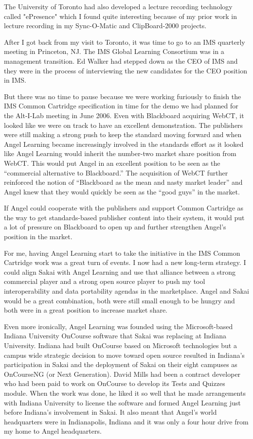 \documentclass[12pt]{book}
\begin{document}
The University of Toronto had also developed a
lecture recording technology called "ePresence" which
I found quite interesting because of my prior
work in lecture recording in my Sync-O-Matic
and ClipBoard-2000 projects.

After I got back from my visit to Toronto, it was
time to go to an IMS quarterly meeting in Princeton,
NJ.  The IMS Global Learning Consortium was in a
management transition.   Ed Walker had
stepped down as the CEO of IMS and they were in the
process of interviewing the new candidates for the
CEO position in IMS.

But there was no time to pause because we were working
furiously to finish the IMS Common Cartridge
specification in time for the demo we had planned
for the Alt-I-Lab meeting in June 2006.  Even with
Blackboard acquiring WebCT, it looked like we were on
track to have an excellent demonstration.  The publishers
were still making a strong push to keep the standard
moving forward and when Angel Learning became increasingly
involved in the standards effort as it looked like
Angel Learning would inherit the number-two
market share position from WebCT.
This would put Angel in an excellent position to be seen
as the ``commercial alternative to Blackboard.''  The
acquisition of WebCT further reinforced the notion of
``Blackboard as the mean and nasty market leader'' and
Angel knew that they would quickly be seen as the
``good guys'' in the market.

If Angel could cooperate with the publishers and
support Common Cartridge as the way to get
standards-based publisher content into
their system, it would put a lot of pressure on
Blackboard to open up and further strengthen Angel's
position in the market.

\begin{sloppypar}
For me, having Angel Learning start to take the initiative
in the IMS Common Cartridge work was a great turn of events.
I now had a new long-term strategy.
I could align Sakai with Angel Learning
and use that alliance between a strong commercial player
and a strong open source player to push my
tool interoperability and data portability agendas
in the marketplace.
Angel and Sakai would be a great combination, both were
still small enough to be hungry and both were in a great
position to increase market share.
\end{sloppypar}

Even more ironically, Angel Learning was founded
using the Microsoft-based Indiana University
OnCourse software that Sakai was replacing
at Indiana University.   Indiana
had built OnCourse based on Microsoft technologies
but a campus wide strategic decision to move toward
open source resulted in Indiana's participation in
Sakai and the deployment of Sakai on their eight
campuses as OnCourseNG (or Next Generation).
David Mills had been a contract developer who had
been paid to work on OnCourse to develop its Tests
and Quizzes module.  When the work was done, he liked
it so well that he made arrangements with Indiana
University to license the software and formed
Angel Learning just before Indiana's involvement
in Sakai.  It also meant that Angel's world
headquarters were in Indianapolis, Indiana and it
was only a four hour drive from my home to Angel
headquarters.
\end{document}
